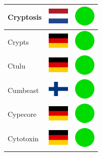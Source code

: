 \documentclass[12pt, a4paper, twoside]{report}
\begin{document}
\begin{center}
\begin{longtable}{|p{5cm}|p{2cm}|p{2cm}|}
 Cryptosis                                                  & \includegraphics[width=1cm]{../img/flags/nl} &   \includegraphics[width=1cm]{../likes/y} \\ \hline
 Crypts                                                     & \includegraphics[width=1cm]{../img/flags/de} &   \includegraphics[width=1cm]{../likes/y} \\ \hline
 Ctulu                                                      & \includegraphics[width=1cm]{../img/flags/de} &   \includegraphics[width=1cm]{../likes/y} \\ \hline
 Cumbeast                                                   & \includegraphics[width=1cm]{../img/flags/fi} &   \includegraphics[width=1cm]{../likes/y} \\ \hline
 Cypecore                                                   & \includegraphics[width=1cm]{../img/flags/de} &   \includegraphics[width=1cm]{../likes/y} \\ \hline
 Cytotoxin                                                  & \includegraphics[width=1cm]{../img/flags/de} &   \includegraphics[width=1cm]{../likes/y} \\ \hline

\end{longtable}
\end{center}
\end{document}
